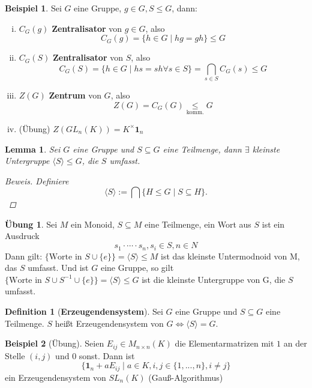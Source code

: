 \documentclass[a4paper]{report}
\theoremstyle{plain}
\newtheorem{lemm}[thm]{Lemma}
\theoremstyle{definition}
\newtheorem{defi}[thm]{Definition}
\newtheorem*{bsp*}{Beispiel}
\newtheorem{ubng}[thm]{Übung}
\begin{document}
\begin{bsp*}
  Sei $G$ eine Gruppe, $g  \in G, S \le G$, dann:
  \begin{enumerate}[(i)] %
\item $C_{G}(g)$ \textbf{Zentralisator} von $g \in G$, also $$C_{G}(g) = \{h \in G \mid hg = gh\} \le G$$
\item $C_{G}(S)$ \textbf{Zentralisator} von $S$, also $$C_{G}(S) = \{h \in G \mid hs = sh \forall s \in S\} = \bigcap_{s \in S} C_{G}(s) \le G$$
\item $Z(G)$ \textbf{Zentrum} von $G$, also $$Z(G)=C_{G}(G) \underset{\text{komm.}}\le G$$
\item (Übung) $Z(GL_{n}(K)) = K^{\times}\mathbf{1}_{n}$
  \end{enumerate}

\end{bsp*}

\begin{lemm}
  Sei $G$ eine Gruppe und $S \subseteq G$ eine Teilmenge, dann $\exists$ kleinste Untergruppe $\langle S \rangle \le G$, die $S$ umfasst.
  \begin{proof}[Beweis]
    Definiere $$\langle S \rangle := \bigcap \{H \leq G \mid S \subseteq H\}.$$
  \end{proof}

\end{lemm}

\begin{ubng}
Sei $M$ ein Monoid, $S \subseteq M$ eine Teilmenge, ein Wort aus $S$ ist ein Ausdruck $$s_{1} \cdot \cdots \cdot s_{n}, s_{i} \in S, n\in N$$
Dann gilt: $\{\text{Worte in } S \cup \{e\}\} = \langle S \rangle \le M$ ist das kleinste Untermodnoid von M, das $S$ umfasst.
Und ist $G$ eine Gruppe, so gilt $\{\text{Worte in } S \cup S^{-1} \cup \{e\}\} = \langle S \rangle \le G$ ist die kleinste Untergruppe von G, die $S$ umfasst.
\end{ubng}

\begin{defi}[\textbf{Erzeugendensystem}]
Sei $G$ eine Gruppe und $S \subseteq G$ eine Teilmenge. $S$ heißt Erzeugendensystem von $G \iff \langle S \rangle = G$.
\end{defi}

\begin{bsp*}[Übung]
Seien $E_{ij} \in M_{n \times n}(K)$ die Elementarmatrizen mit $1$ an der Stelle $(i,j)$ und $0$ sonst. Dann ist
$$\{\mathbf 1_{n} + aE_{ij} \mid a \in K, i,j \in \{1, ..., n\}, i \neq j\}$$
ein Erzeugendensystem von $SL_{n}(K)$ (Gauß-Algorithmus)
\end{bsp*}
\end{document}
